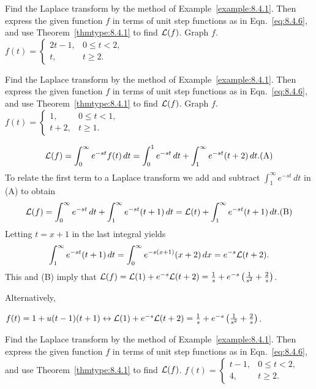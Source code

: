 \documentclass{ximera}
\begin{document}
\begin{problem}\label{exer:8.4.3}
Find the Laplace transform by
the method of Example~\ref{example:8.4.1}. Then express the given function
$f$ in terms of unit step functions as in Eqn.~\eqref{eq:8.4.6}, and use
Theorem~\ref{thmtype:8.4.1} to find ${\cal L}(f)$.  Graph $f$.
$f(t)=\left\{\begin{array}{cl} 2t-1,&
0\le t<2,\\  t,&t\ge2.\end{array}\right.$
\end{problem}

\begin{problem}\label{exer:8.4.4}
Find the Laplace transform by
the method of Example~\ref{example:8.4.1}. Then express the given function
$f$ in terms of unit step functions as in Eqn.~\eqref{eq:8.4.6}, and use
Theorem~\ref{thmtype:8.4.1} to find ${\cal L}(f)$.  Graph $f$.
$f(t)=\left\{\begin{array}{cl}1,
&0\le t<1,\\ t+2,&t\ge1.\end{array}\right.$

\begin{solution}
$$
{\cal L}(f)  =\int_0^\infty e^{-st}f(t)\, dt
 =\int_0^1 e^{-st}\,dt+\int_1^\infty e^{-st}(t+2)\,dt.
\text{(A)}
$$
To relate the first term to a Laplace transform we  add and subtract
$\int_1^\infty e^{-st}\, dt$
  in (A) to obtain
$$
{\cal L}(f)=\int_0^\infty e^{-st}\,dt+
\int_1^\infty e^{-st}(t+1)\, dt
={\cal L}(t)+\int_1^\infty e^{-st}(t+1)\,dt.
\text{(B)}
$$
Letting $t=x+1$  in the last integral yields
$$
\int_1^\infty e^{-st}(t+1)\,dt=\int_0^\infty e^{-s(x+1)}(x+2)\,dx
 =e^{-s}{\cal L}(t+2).
$$
This and (B) imply that
$ {\cal L}(f)={\cal L}(1)+e^{-s}{\cal L}(t+2)
=\frac{1}{s}+e^{-s}\left(\frac{1}{s^2}+\frac{2}{s}\right)$.

Alternatively,

 $f(t)= 1+u(t-1)(t+1)\leftrightarrow {\cal L}(1)+e^{-s}{\cal
L}(t+2)=
\frac{1}{s}+e^{-s}\left(\frac{1}{s^2}+\frac{2}{s}\right)$.
\end{solution}
\end{problem}

\begin{problem}\label{exer:8.4.5}
Find the Laplace transform by
the method of Example~\ref{example:8.4.1}. Then express the given function
$f$ in terms of unit step functions as in Eqn.~\eqref{eq:8.4.6}, and use
Theorem~\ref{thmtype:8.4.1} to find ${\cal L}(f)$.
$f(t)=\left\{\begin{array}{cl} t-1,& 0\le
t<2,\\ 4,&t\ge2.\end{array}\right.$
\end{problem}
\end{document}
